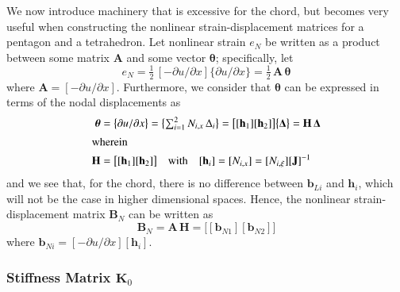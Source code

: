 We now introduce machinery that is excessive for the chord, but becomes very useful when constructing the nonlinear strain-displacement matrices for a pentagon and a tetrahedron.  Let nonlinear strain $e_N$ be written as a product between some matrix $\mathbf{A}$ and some vector $\boldsymbol{\theta}$; specifically, let
\begin{equation}
e_ N =  \tfrac{1}{2} \,
[-\partial u / \partial x ]
\{\partial u / \partial x\}
= \tfrac{1}{2} \, \mathbf{A} \, \boldsymbol{\theta} 
\end{equation}
where $\mathbf{A} = [ -\partial u / \partial x ]$.  Furthermore, we consider that $\boldsymbol{\theta}$ can be expressed in terms of the nodal displacements as
\begin{subequations}
    \begin{align}
    \boldsymbol{\theta} & =  \bigl\{
    \partial u / \partial x
    \bigr\}
    = \bigl\{ \begin{matrix}
    \sum\nolimits_{i=1}^2 N_{i,x} \, \Delta_i
    \end{matrix} \bigr\}
    = \bigl[ [\mathbf{h}_1] [\mathbf{h}_2] \bigr] 
    \bigl\{ \boldsymbol{\Delta} \bigr\}
    = \mathbf{H} \, \boldsymbol{\Delta} \\
    \intertext{wherein}
    \mathbf{H} & = \bigl[ [\mathbf{h}_1] [\mathbf{h}_2] \bigr]
    \quad \text{with} \quad
    [\mathbf{h}_i] = [N_{i,x}] = [N_{i,\xi}] [ \mathbf{J}]^{-1}
    \end{align}
\end{subequations}
and we see that, for the chord, there is no difference between $\mathbf{b}_{Li}$ and $\mathbf{h}_i$, which will not be the case in higher dimensional spaces.  Hence, the nonlinear strain-displacement matrix $\mathbf{B}_N$ can be written as
\begin{equation}
\mathbf{B}_N = \mathbf{A} \, \mathbf{H}  =  
\bigl[ [\mathbf{b}_{N1}] [\mathbf{b}_{N2}] \bigr]
\end{equation}
where $\mathbf{b}_{Ni} = [-\partial u / \partial x] [ \mathbf{h}_i ]$.

\subsubsection{Stiffness Matrix $\mathbf{K}_0$}

